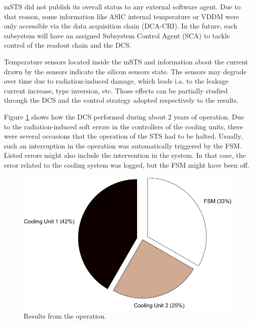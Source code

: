 \gls{mSTS} did not publish its overall status to any external software agent. Due to that reason, some information like \gls{ASIC} internal temperature or VDDM were only accessible via the data acquisition chain (\gls{DCA}-\gls{CRI}). In the future, each subsystem will have an assigned Subsystem Control Agent (\gls{SCA}) to tackle control of the readout chain and the \gls{DCS}. 


Temperature sensors located inside the \gls{mSTS} and information about the current drawn by the sensors indicate the silicon sensors state. The sensors may degrade over time due to radiation-induced damage,  which leads i.a. to the leakage current increase, type inversion, etc. Those effects can be partially studied through the \gls{DCS} and the control strategy adopted respectively to the results.

Figure \ref{fig_dcs_results} shows how the \gls{DCS} performed during about 2 years of operation. Due to the radiation-induced soft errors in the controllers of the cooling units, there were several occasions that the operation of the \gls{STS} had to be halted. Usually, such an interruption in the operation was automatically triggered by the \gls{FSM}. Listed errors might also include the intervention in the system. In that case, the error related to the cooling system was logged, but the FSM might have been off.
\begin{figure}[!h]
\centering
\includegraphics[width=0.55\columnwidth]{Chapter6/DCS/images/DCSpie.png}
\caption{Results from the operation.}
\label{fig_dcs_results}
\end{figure}

